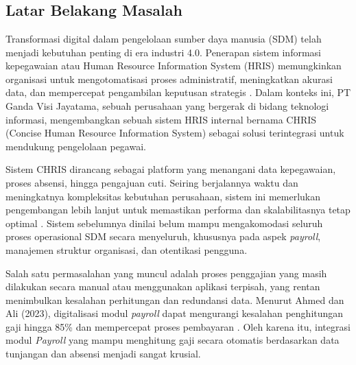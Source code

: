 \chapter{\babSatu}

\section{Latar Belakang Masalah}

Transformasi digital dalam pengelolaan sumber daya manusia (SDM) telah menjadi kebutuhan penting di era industri 4.0. Penerapan sistem informasi kepegawaian atau Human Resource Information System (HRIS) memungkinkan organisasi untuk mengotomatisasi proses administratif, meningkatkan akurasi data, dan mempercepat pengambilan keputusan strategis \cite{normalini2012antecedents}. Dalam konteks ini, PT Ganda Visi Jayatama, sebuah perusahaan yang bergerak di bidang teknologi informasi, mengembangkan sebuah sistem HRIS internal bernama CHRIS (Concise Human Resource Information System) sebagai solusi terintegrasi untuk mendukung pengelolaan pegawai.

Sistem CHRIS dirancang sebagai platform yang menangani data kepegawaian, proses absensi, hingga pengajuan cuti. Seiring berjalannya waktu dan meningkatnya kompleksitas kebutuhan perusahaan, sistem ini memerlukan pengembangan lebih lanjut untuk memastikan performa dan skalabilitasnya tetap optimal \cite{panjaitan2023implementing}. Sistem sebelumnya dinilai belum mampu mengakomodasi seluruh proses operasional SDM secara menyeluruh, khususnya pada aspek \textit{payroll}, manajemen struktur organisasi, dan otentikasi pengguna.

Salah satu permasalahan yang muncul adalah proses penggajian yang masih dilakukan secara manual atau menggunakan aplikasi terpisah, yang rentan menimbulkan kesalahan perhitungan dan redundansi data. Menurut Ahmed dan Ali (2023), digitalisasi modul \textit{payroll} dapat mengurangi kesalahan penghitungan gaji hingga 85\% dan mempercepat proses pembayaran \cite{ahmed2023web}. Oleh karena itu, integrasi modul \textit{Payroll} yang mampu menghitung gaji secara otomatis berdasarkan data tunjangan dan absensi menjadi sangat krusial.

